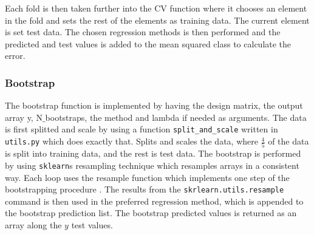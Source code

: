\documentclass[../main.tex]{subfiles}
\begin{document}
Each fold is then taken further into the CV function where it chooses an element in the fold and sets the rest of the elements as training data. The current element is set test data. The chosen regression methods is then performed and the predicted and test values is added to the mean squared class to calculate the error.

\subsubsection{Bootstrap}
The bootstrap function is implemented by having the design matrix, the output array y, N$\_$bootstraps, the method and lambda if needed as arguments. The data is first splitted and scale by using a function \verb|split_and_scale| written in \verb|utils.py| which does exactly that. Splits and scales the data, where $\frac{4}{5}$ of the data is split into training data, and the rest is test data. The bootstrap is performed by using \verb|sklearn|s resampling technique which resamples arrays in a consistent way. Each loop uses the resample function which implements one step of the bootstrapping procedure \cite{scikitlearn}. The results from the \verb|skrlearn.utils.resample| command is then used in the preferred regression method, which is appended to the bootstrap prediction list. The bootstrap predicted values is returned as an array along the $y$ test values.
\end{document}
